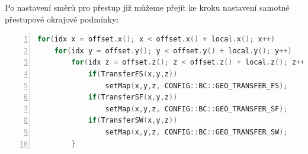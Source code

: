         Po nastaven\'{i} sm\v{e}r\r{u} pro p\v{r}estup ji\v{z} m\r{u}\v{z}eme p\v{r}ej\'{i}t ke kroku nastaven\'{i} samotn\'{e} p\v{r}estupov\'{e} okrajov\'{e} podm\'{i}nky:

        \begin{lstlisting}[frame=single, backgroundcolor=\color{light-gray}, commentstyle=\color{codegray}, basicstyle=\footnotesize\ttfamily, language=C++, numbers=left, numberstyle=\tiny\color{black}]
for(idx x = offset.x(); x < offset.x() + local.x(); x++)
    for(idx y = offset.y(); y < offset.y() + local.y(); y++)
        for(idx z = offset.z(); z < offset.z() + local.z(); z++){
            if(TransferFS(x,y,z))
                setMap(x,y,z, CONFIG::BC::GEO_TRANSFER_FS);
            if(TransferSF(x,y,z))	
                setMap(x,y,z, CONFIG::BC::GEO_TRANSFER_SF);
            if(TransferSW(x,y,z))
                setMap(x,y,z, CONFIG::BC::GEO_TRANSFER_SW);
        }			    
        \end{lstlisting}

